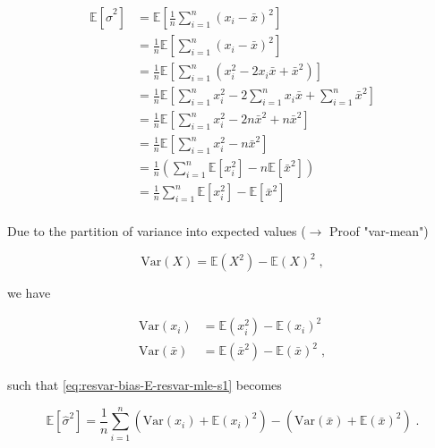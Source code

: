 \documentclass[a4paper,12pt]{book}
\begin{document}
\begin{equation} \label{eq:resvar-bias-E-resvar-mle-s1}
\begin{split}
\mathbb{E}\left[ \hat{\sigma}^2 \right] &= \mathbb{E}\left[ \frac{1}{n} \sum_{i=1}^{n} \left( x_i - \bar{x} \right)^2 \right] \\
&= \frac{1}{n} \mathbb{E}\left[ \sum_{i=1}^{n} \left( x_i - \bar{x} \right)^2 \right] \\
&= \frac{1}{n} \mathbb{E}\left[ \sum_{i=1}^{n} \left( x_i^2 - 2 x_i \bar{x} + \bar{x}^2 \right) \right] \\
&= \frac{1}{n} \mathbb{E}\left[ \sum_{i=1}^{n} x_i^2 - 2 \sum_{i=1}^{n} x_i \bar{x} + \sum_{i=1}^{n} \bar{x}^2 \right] \\
&= \frac{1}{n} \mathbb{E}\left[ \sum_{i=1}^{n} x_i^2 - 2 n \bar{x}^2 + n \bar{x}^2 \right] \\
&= \frac{1}{n} \mathbb{E}\left[ \sum_{i=1}^{n} x_i^2 - n \bar{x}^2 \right] \\
&= \frac{1}{n} \left( \sum_{i=1}^{n} \mathbb{E} \left[ x_i^2 \right] - n \mathbb{E}\left[ \bar{x}^2 \right] \right) \\
&= \frac{1}{n} \sum_{i=1}^{n} \mathbb{E} \left[ x_i^2 \right] - \mathbb{E}\left[ \bar{x}^2 \right] \\
\end{split}
\end{equation}

Due to the partition of variance into expected values ($\rightarrow$ Proof "var-mean")

\begin{equation} \label{eq:resvar-bias-var-mean}
\mathrm{Var}(X) = \mathbb{E}(X^2) - \mathbb{E}(X)^2 \; ,
\end{equation}

we have

\begin{equation} \label{eq:resvar-bias-Var-xi-xb}
\begin{split}
\mathrm{Var}(x_i) &= \mathbb{E}(x_i^2) - \mathbb{E}(x_i)^2 \\
\mathrm{Var}(\bar{x}) &= \mathbb{E}(\bar{x}^2) - \mathbb{E}(\bar{x})^2 \; ,
\end{split}
\end{equation}

such that \eqref{eq:resvar-bias-E-resvar-mle-s1} becomes

\begin{equation} \label{eq:resvar-bias-E-resvar-mle-s2}
\mathbb{E}\left[ \hat{\sigma}^2 \right] = \frac{1}{n} \sum_{i=1}^{n} \left( \mathrm{Var}(x_i) + \mathbb{E}(x_i)^2 \right) - \left( \mathrm{Var}(\bar{x}) + \mathbb{E}(\bar{x})^2 \right) \; .
\end{equation}
\end{document}
